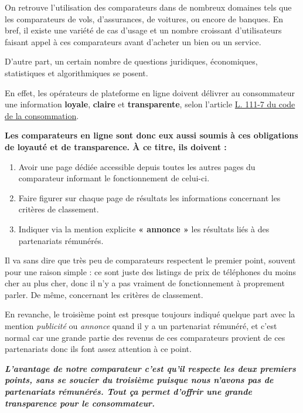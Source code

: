 \documentclass[
  12pt,
]{report}
\begin{document}
On retrouve l'utilisation des comparateurs dans de nombreux domaines
tels que les comparateurs de vols, d'assurances, de voitures, ou encore
de banques. En bref, il existe une variété de cas d'usage et un nombre
croissant d'utilisateurs faisant appel à ces comparateurs avant
d'acheter un bien ou un service.

D'autre part, un certain nombre de questions juridiques, économiques,
statistiques et algorithmiques se posent.

En effet, les opérateurs de plateforme en ligne doivent délivrer au
consommateur une information \textbf{loyale}, \textbf{claire} et
\textbf{transparente}, selon l'article
\href{https://www.legifrance.gouv.fr/codes/article_lc/LEGIARTI000033219601}{L.
111-7 du code de la consommation}.

\textbf{Les comparateurs en ligne sont donc eux aussi soumis à ces
obligations de loyauté et de transparence. À ce titre, ils doivent :}

\begin{enumerate}
\def\labelenumi{\arabic{enumi}.}
\item
  Avoir une page dédiée accessible depuis toutes les autres pages du
  comparateur informant le fonctionnement de celui-ci.
\item
  Faire figurer sur chaque page de résultats les informations concernant
  les critères de classement.
\item
  Indiquer via la mention explicite \textbf{« annonce »} les résultats
  liés à des partenariats rémunérés.
\end{enumerate}

Il va sans dire que très peu de comparateurs respectent le premier
point, souvent pour une raison simple : ce sont juste des listings de
prix de téléphones du moins cher au plus cher, donc il n'y a pas
vraiment de fonctionnement à proprement parler. De même, concernant les
critères de classement.

En revanche, le troisième point est presque toujours indiqué quelque
part avec la mention \emph{publicité} ou \emph{annonce} quand il y a un
partenariat rémunéré, et c'est normal car une grande partie des revenus
de ces comparateurs provient de ces partenariats donc ils font assez
attention à ce point.

\textbf{\emph{L'avantage de notre comparateur c'est qu'il respecte les
deux premiers points, sans se soucier du troisième puisque nous n'avons
pas de partenariats rémunérés. Tout ça permet d'offrir une grande
transparence pour le consommateur.}}
\end{document}
